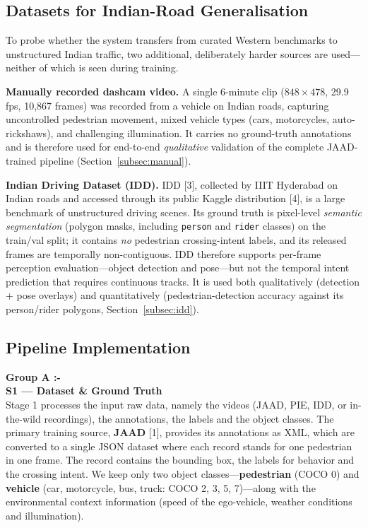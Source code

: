 \documentclass[conference]{IEEEtran}
\begin{document}
\subsection{Datasets for Indian-Road Generalisation}
To probe whether the system transfers from curated Western benchmarks to unstructured Indian traffic, two additional, deliberately harder sources are used---neither of which is seen during training.

\noindent\textbf{Manually recorded dashcam video.} A single 6-minute clip ($848\times478$, 29.9\,fps, 10{,}867 frames) was recorded from a vehicle on Indian roads, capturing uncontrolled pedestrian movement, mixed vehicle types (cars, motorcycles, auto-rickshaws), and challenging illumination. It carries no ground-truth annotations and is therefore used for end-to-end \emph{qualitative} validation of the complete JAAD-trained pipeline (Section~\ref{subsec:manual}).

\noindent\textbf{Indian Driving Dataset (IDD).} IDD [3], collected by IIIT Hyderabad on Indian roads and accessed through its public Kaggle distribution [4], is a large benchmark of unstructured driving scenes. Its ground truth is pixel-level \emph{semantic segmentation} (polygon masks, including \texttt{person} and \texttt{rider} classes) on the train/val split; it contains \emph{no} pedestrian crossing-intent labels, and its released frames are temporally non-contiguous. IDD therefore supports per-frame perception evaluation---object detection and pose---but not the temporal intent prediction that requires continuous tracks. It is used both qualitatively (detection + pose overlays) and quantitatively (pedestrian-detection accuracy against its person/rider polygons, Section~\ref{subsec:idd}).

\subsection{Pipeline Implementation}
\vspace{8pt}
\noindent\textbf{Group A :- }
\mbox{}\\
\textbf{S1 --- Dataset \& Ground Truth} \\
Stage 1 processes the input raw data, namely the videos (JAAD, PIE, IDD, or in-the-wild recordings), the annotations, the labels and the object classes. The primary training source, \textbf{JAAD} [1], provides its annotations as XML, which are converted to a single JSON dataset where each record stands for one pedestrian in one frame. The record contains the bounding box, the labels for behavior and the crossing intent. We keep only two object classes---\textbf{pedestrian} (COCO 0) and \textbf{vehicle} (car, motorcycle, bus, truck: COCO 2, 3, 5, 7)---along with the environmental context information (speed of the ego-vehicle, weather conditions and illumination).
\end{document}
